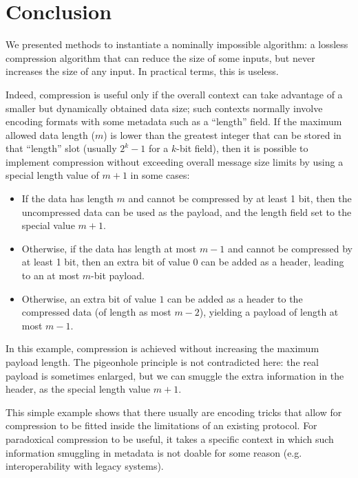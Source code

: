 \documentclass{llncs}
\begin{document}
\section{Conclusion}\label{sec:conclusion}

We presented methods to instantiate a nominally impossible algorithm: a
lossless compression algorithm that can reduce the size of some inputs,
but never increases the size of any input. In practical terms, this is
useless.

Indeed, compression is useful only if the overall context can take
advantage of a smaller but dynamically obtained data size; such contexts
normally involve encoding formats with some metadata such as a
``length'' field. If the maximum allowed data length ($m$) is lower than
the greatest integer that can be stored in that ``length'' slot (usually
$2^k-1$ for a $k$-bit field), then it is possible to implement compression
without exceeding overall message size limits by using a special length
value of $m+1$ in some cases:
\begin{itemize}
    \item If the data has length $m$ and cannot be compressed by at least
    1 bit, then the uncompressed data can be used as the payload, and the
    length field set to the special value $m+1$.

    \item Otherwise, if the data has length at most $m-1$ and cannot be
    compressed by at least 1 bit, then an extra bit of value $0$ can be
    added as a header, leading to an at most $m$-bit payload.

    \item Otherwise, an extra bit of value $1$ can be added as a header
    to the compressed data (of length as most $m-2$), yielding a payload
    of length at most $m-1$.
\end{itemize}
In this example, compression is achieved without increasing the maximum
payload length. The pigeonhole principle is not contradicted here: the
real payload is sometimes enlarged, but we can smuggle the extra information
in the header, as the special length value $m+1$.

This simple example shows that there usually are encoding tricks that
allow for compression to be fitted inside the limitations of an existing
protocol. For paradoxical compression to be useful, it takes a specific
context in which such information smuggling in metadata is not doable
for some reason (e.g. interoperability with legacy systems).
\end{document}
